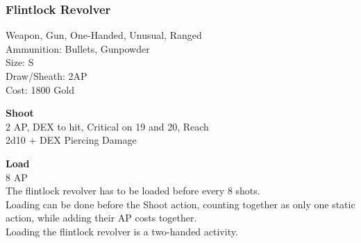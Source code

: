 \subsubsection{Flintlock Revolver}\label{weapon:flintlockRevolver}
Weapon, Gun, One-Handed, Unusual, Ranged\\
Ammunition: Bullets, Gunpowder\\
Size: S\\
Draw/Sheath: 2AP\\
Cost: 1800 Gold

\textbf{Shoot} \\
2 AP, DEX to hit, Critical on 19 and 20,  Reach\\
2d10 + DEX Piercing Damage

\textbf{Load} \\
8 AP\\
The flintlock revolver has to be loaded before every 8 shots.\\
Loading can be done before the Shoot action, counting together as only one static action, while adding their AP costs together.\\
Loading the flintlock revolver is a two-handed activity.
